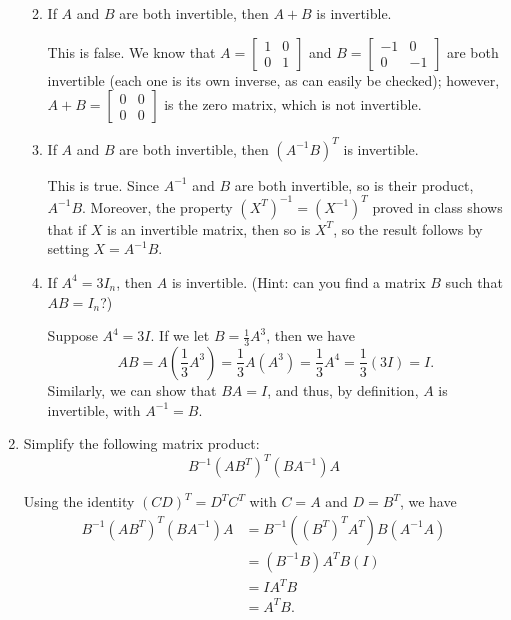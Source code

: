 \documentclass[letterpaper,12pt]{article}
\begin{document}
\begin{enumerate}
\begin{enumerate}
\bigskip

 \item If $A$ and $B$ are both invertible, then $A+B$ is invertible.

\bigskip

 This is false. We know that $A=\begin{bmatrix}1&0\\0&1\end{bmatrix}$ and $B=\begin{bmatrix}-1&0\\0&-1\end{bmatrix}$ are both invertible (each one is its own inverse, as can easily be checked); however, $A+B = \begin{bmatrix}0&0\\0&0\end{bmatrix}$ is the zero matrix, which is not invertible.

\bigskip

 \item If $A$ and $B$ are both invertible, then $(A^{-1}B)^T$ is invertible.

\bigskip

 This is true. Since $A^{-1}$ and $B$ are both invertible, so is their product, $A^{-1}B$. Moreover, the property $(X^T)^{-1} = (X^{-1})^T$ proved in class shows that if $X$ is an invertible matrix, then so is $X^T$, so the result follows by setting $X=A^{-1}B$.


\bigskip

 \item If $A^4=3I_n$, then $A$ is invertible. (Hint: can you find a matrix $B$ such that $AB=I_n$?)

\bigskip

 Suppose $A^4=3I$. If we let $B= \frac{1}{3}A^3$, then we have
\[
 AB = A\left(\frac{1}{3}A^3\right) = \frac{1}{3}A(A^3) = \frac{1}{3}A^4 = \frac{1}{3}(3I)=I.
\]
Similarly, we can show that $BA=I$, and thus, by definition, $A$ is invertible, with $A^{-1}=B$.

\bigskip

\end{enumerate}
\item Simplify the following matrix product:
\[
 B^{-1}(AB^T)^T(BA^{-1})A
\]

\bigskip

 Using the identity $(CD)^T = D^TC^T$ with $C=A$ and $D=B^T$, we have
\begin{align*}
 B^{-1}(AB^T)^T(BA^{-1})A& = B^{-1}((B^T)^TA^T)B(A^{-1}A)\\
& = (B^{-1}B)A^TB(I)\\
& = IA^TB\\
& = A^TB.
\end{align*}


\end{enumerate}
\end{document}
